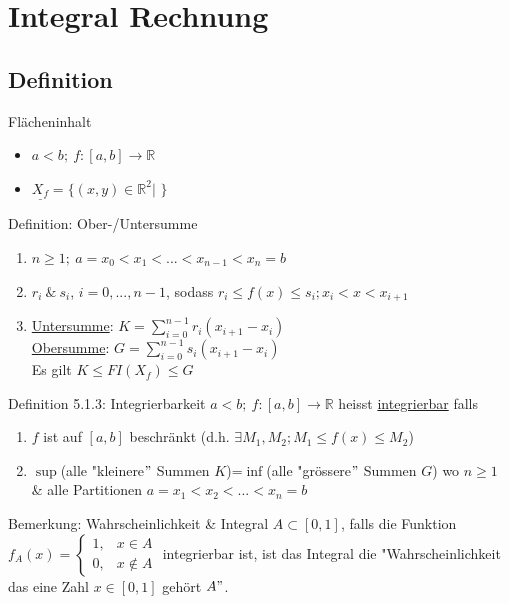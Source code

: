 \documentclass[a4paper,10pt]{article}
\begin{document}
\section{Integral Rechnung}
\subsection{Definition}
\begin{defbox}
    {Flächeninhalt}
    \begin{itemize}
        \item $a<b;\ f:[a,b]\longrightarrow \mathbb R$
        \item  $\underline{X_f}=\bigg\{(x,y)\in \mathbb R^2\big|$
        $\bigg \} $
    \end{itemize}
\end{defbox}
\begin{defbox}
    {Definition: Ober-/Untersumme}
    \begin{enumerate}
        \item $n\ge 1; \ a=x_0<x_1<...<x_{n-1}<x_n=b$
        \item $r_i \ \& \ s_i$, $i=0,...,n-1$, sodass $r_i\le f(x)\le s_i; x_i<x<x_{i+1}$
        \item \underline{Untersumme}: $K=\sum_{i=0}^{n-1}r_i(x_{i+1}-x_i)$
        \\ \underline{Obersumme}: $G=\sum_{i=0}^{n-1}s_i(x_{i+1}-x_i)$
        \\ Es gilt $K\le FI(X_f)\le G$
    \end{enumerate}
\end{defbox}
\begin{defbox}
    {Definition 5.1.3: Integrierbarkeit}
    $a<b;\ f:[a,b]\longrightarrow \mathbb R$ heisst \underline{integrierbar} falls
    \begin{enumerate}
        \item $f$ ist auf $[a,b]$ beschränkt (d.h. $\exists M_1, M_2; M_1\le f(x)\le M_2$)
        \item  $\sup$(alle "kleinere$"$ Summen $K$)=$\inf$(alle "grössere$"$ Summen $G$) wo $n\ge 1$ \& alle Partitionen $a=x_1<x_2<...<x_n=b$
    \end{enumerate}
\end{defbox}
\begin{bembox}
    {Bemerkung: Wahrscheinlichkeit \& Integral}
    $A\subset [0,1]$, falls die Funktion $f_A(x)=
    \begin{cases}
        1, & x\in A
        \\ 0, & x\notin A
    \end{cases}$
    integrierbar ist, ist das Integral die "Wahrscheinlichkeit das eine Zahl $x\in[0,1]$ gehört $A"$.
\end{bembox}
\end{document}
